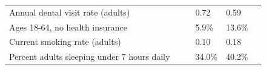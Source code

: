 \documentclass[9pt]{report}
\begin{document}
\begin{tabular}{p{.10in}p{.10in}p{.10in}p{3.7in}>{\hfill}p{.85in}>{\hfill}p{.85in}>{\hfill}p{.85in}>{\hfill}p{.85in}p{0.1in}}
\multicolumn{4}{l}{\parbox{3.6in}{\strut\raggedright{{Annual dental visit rate (adults)}}\strut}} &  &  & 0.72 & 0.59 & \multicolumn{1}{l}{}  \\ 
\multicolumn{4}{l}{\parbox{3.6in}{\strut\raggedright{{Ages 18-64, no health insurance}}\strut}} &  &  & 5.9\% & 13.6\% & \multicolumn{1}{l}{}  \\ 
\multicolumn{4}{l}{\parbox{3.6in}{\strut\raggedright{{Current smoking rate (adults)}}\strut}} &  &  & 0.10 & 0.18 & \multicolumn{1}{l}{}  \\ 
\multicolumn{4}{l}{\parbox{3.6in}{\strut\raggedright{{Percent adults sleeping under 7 hours daily}}\strut}} &  &  & 34.0\% & 40.2\% & \multicolumn{1}{l}{}  \\ 

\end{tabular}
\setlength{\tabcolsep}{6pt} %


\vspace{36pt}
\linespread{1.5}
\theendnotes
\end{document}
